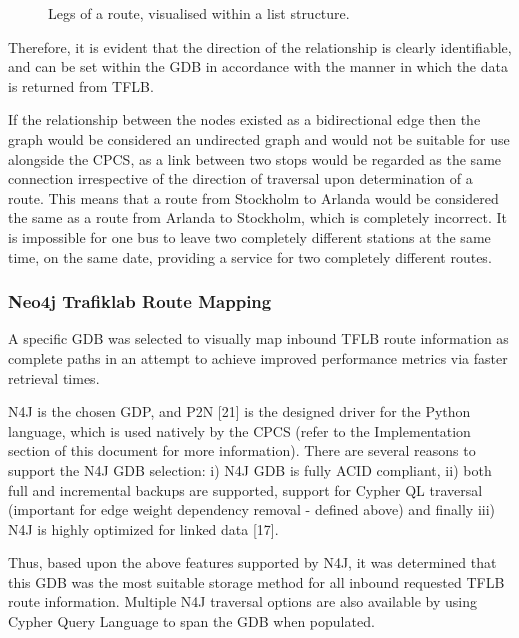 \documentclass[12pt]{article}   	%
\begin{document}
\newpage

\noindent
\hfill
\begin{figure}[htp]

\caption{Legs of a route, visualised within a list structure.}
\end{figure}
\hfill

\noindent
Therefore, it is evident that the direction of the relationship is clearly identifiable, and can be set within the GDB in accordance with the manner in which the data is returned from TFLB.

If the relationship between the nodes existed as a bidirectional edge then the graph would be considered an undirected graph and would not be suitable for use alongside the CPCS, as a link between two stops would be regarded as the same connection irrespective of the direction of traversal upon determination of a route. This means that a route from Stockholm to Arlanda would be considered the same as a route from Arlanda to Stockholm, which is completely incorrect. It is impossible for one bus to leave two completely different stations at the same time, on the same date, providing a service for two completely different routes.

\newpage

\subsubsection{Neo4j Trafiklab Route Mapping}
A specific GDB was selected to visually map inbound TFLB route information as complete paths in an attempt to achieve improved performance metrics via faster retrieval times.

N4J is the chosen GDP, and P2N [21] is the designed driver for the Python language, which is used natively by the CPCS (refer to the Implementation section of this document for more information). There are several reasons to support the N4J GDB selection: i) N4J GDB is fully ACID compliant, ii) both full and incremental backups are supported, support for Cypher QL traversal (important for edge weight dependency removal - defined above) and finally iii) N4J is highly optimized for linked data [17].

Thus, based upon the above features supported by N4J, it was determined that this GDB was the most suitable storage method for all inbound requested TFLB route information. Multiple N4J traversal options are also available by using Cypher Query Language to span the GDB when populated.
\end{document}
